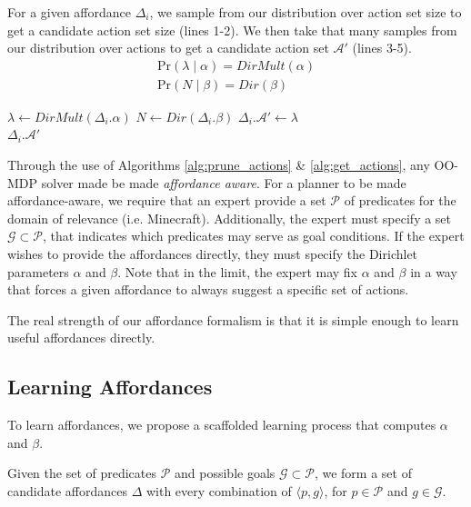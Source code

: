 \documentclass[conference]{IEEEtran}
\begin{document}
For a given affordance $\Delta_i$, we sample from our distribution over action set size to get a candidate action set size (lines 1-2). We then
take that many samples from our distribution over actions to get a candidate action set $\mathcal{A}'$ (lines 3-5).
\begin{align}
\text{Pr}(\lambda \mid \alpha) = DirMult(\alpha) \\
\text{Pr}(N \mid \beta) = Dir(\beta)
\end{align}

\begin{algorithm}
  \caption{$\Delta_i.getActions(s)$}
  \begin{algorithmic}[1]
    \State $\lambda \leftarrow DirMult(\Delta_i.\alpha)$
    \State $N \leftarrow Dir(\Delta_i.\beta)$
    \State $\Delta_i.\mathcal{A}' \leftarrow \lambda$
    \EndFor \\
    \Return $\Delta_i.\mathcal{A}'$
  \end{algorithmic}
  \label{alg:get_actions}
\end{algorithm}

Through the use of Algorithms \ref{alg:prune_actions} \& \ref{alg:get_actions}, any OO-MDP solver made be made
{\it affordance aware}. For a planner to be made affordance-aware, we require that an expert provide a set $\mathcal{P}$ of predicates
for the domain of relevance (i.e. Minecraft). Additionally, the expert must specify a set
$\mathcal{G} \subset \mathcal{P}$, that indicates which predicates may serve as goal conditions. If the expert wishes
to provide the affordances directly, they must specify the Dirichlet parameters $\alpha$ and $\beta$. Note that
in the limit, the expert may fix $\alpha$ and $\beta$ in a way that forces a given
affordance to always suggest a specific set of actions.

The real strength of our affordance formalism is that it is simple enough to learn useful affordances directly.

\subsection{Learning Affordances}

To learn affordances, we propose a scaffolded learning process that computes $\alpha$ and $\beta$.

Given the set of predicates $\mathcal{P}$ and possible goals $\mathcal{G} \subset \mathcal{P}$, we form a set of candidate affordances $\Delta$ with every combination of $\langle p, g \rangle$, for $p \in \mathcal{P}$ and $g \in \mathcal{G}$.
\end{document}
